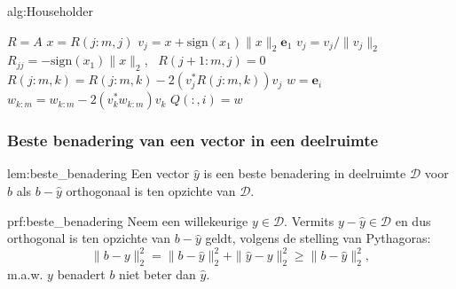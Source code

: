 \begin{alg}{alg:Householder}
    \vspace{-0.3cm}
    \begin{tcolorbox}[colback=white, colframe=gray, arc=0mm] 
        \begin{algorithmic}[1]
            \State $R = A$
            \State
                \State $x= R(j:m,j)$
                \State $v_j = x + \text{sign}(x_1)\|x\|_2 \boldsymbol{e}_1$
                \State $v_j = v_j / \|v_j\|_2$
                \State $R_{jj} = -\text{sign}(x_1)\|x\|_2$, \ $R(j+1:m,j) = 0$
                    \State $R(j:m,k) = R(j:m,k) - 2(v_j^*R(j:m,k))v_j$
                \EndFor
            \EndFor 
            \State
                \State $w = \boldsymbol{e}_i$
                    \State $w_{k:m} = w_{k:m} - 2(v_k^*w_{k:m})v_k$
                \EndFor
                \State $Q(:,i) = w$
            \EndFor
        \end{algorithmic}
    \end{tcolorbox}
    \vspace{-0.3cm}
\end{alg}

\newpage

\subsubsection{Beste benadering van een vector in een deelruimte}

\vspace{0.5cm}

\begin{lem}{lem:beste_benadering}
    \vspace{-0.1cm}
    Een vector $\hat{y}$ is een beste benadering in deelruimte $\mathcal{D}$ voor $b$ als $b - \hat{y}$ orthogonaal is ten opzichte van $\mathcal{D}$.
    \vspace{-0.1cm}
\end{lem}

\begin{prf}{prf:beste_benadering}
    \vspace{-0.1cm}
    Neem een willekeurige $y \in \mathcal{D}$. Vermits $y-\hat{y} \in \mathcal{D}$ en dus orthogonal is ten opzichte van $b - \hat{y}$ geldt, volgens de stelling van Pythagoras:
    \begin{equation*}
        \|b - y\|_2^2 = \| b - \hat{y}\|_2^2 + \| \hat{y} - y\|_2^2 \geq \| b - \hat{y}\|_2^2,
    \end{equation*}
    m\@.a\@.w\@. $y$ benadert $b$ niet beter dan $\hat{y}$.
    \vspace{-0.3cm}
\end{prf}

